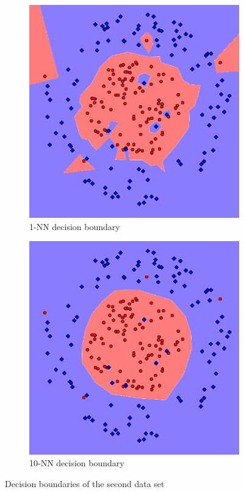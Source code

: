 \documentclass[letterpaper,10pt]{article} %
\begin{document}
\begin{figure}[h]
\begin{subfigure}[b]{\textwidth}
\includegraphics[width=\textwidth]{handout/q3-2-NN}
\caption{1-NN decision boundary}
\label{fig:1nn2}
\end{subfigure}

\begin{subfigure}[b]{\textwidth}
\includegraphics[width=\textwidth]{handout/q3-2-10NN}
\caption{10-NN decision boundary}
\label{fig:10nn2}
\end{subfigure}

\caption{Decision boundaries of the second data set}\label{fig:decision2}
\end{figure}
\end{document}

